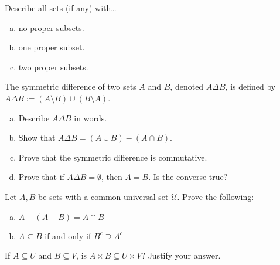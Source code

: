 \documentclass[11pt,letterpaper]{article}
\begin{document}
\homework{}

 Describe all sets (if any) with\dots
        \begin{enumerate}[(a)] 
        \item no proper subsets. 
        \item one proper subset. 
        \item two proper subsets. 
        \end{enumerate}





\newpage





 The symmetric difference of two sets $A$ and $B$, denoted $A \Delta B$, is defined by $A \Delta B:= (A \setminus B) \cup (B \setminus A)$. 
	\begin{enumerate}[(a)]
	\item Describe $A \Delta B$ in words. 
	\item Show that $A \Delta B= (A \cup B) - (A \cap B)$.
	\item Prove that the symmetric difference is commutative. 
	\item Prove that if $A \Delta B= \emptyset$, then $A= B$. Is the converse true? 
	\end{enumerate}





\newpage





 Let $A, B$ be sets with a common universal set $\mathscr{U}$. Prove the following:
	\begin{enumerate}[(a)]
	\item $A - (A - B)= A \cap B$
	\item $A \subseteq B$ if and only if $B^c \supseteq A^c$
	\end{enumerate}





\newpage





 If $A \subseteq U$ and $B \subseteq V$, is $A \times B \subseteq U \times V$? Justify your answer. \pspace





\newpage
\end{document}
